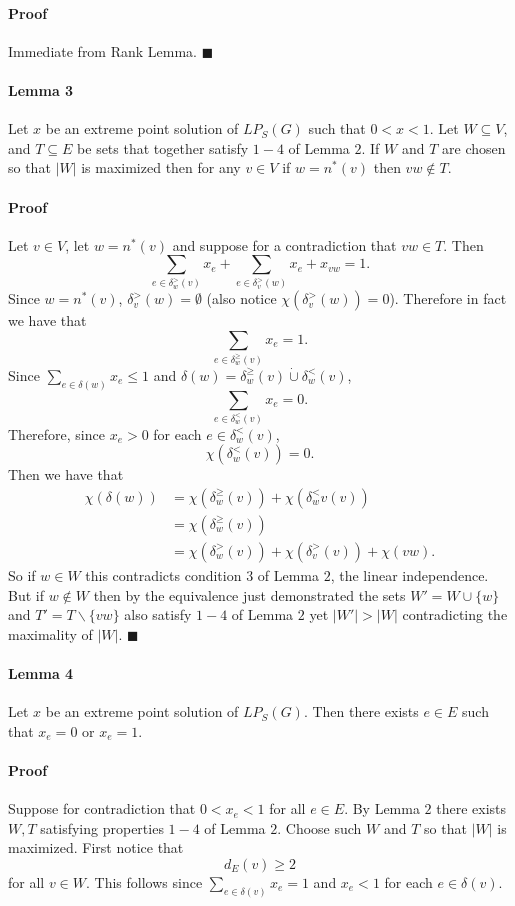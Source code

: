 \documentclass[letterpaper,12pt,oneside,onecolumn]{article}
\begin{document}
\paragraph{Proof}
Immediate from Rank Lemma. $\blacksquare$
\paragraph{Lemma 3}
Let $x$ be an extreme point solution of $LP_S(G)$ such that $0 < x < 1$. Let $W \subseteq V$, and $T \subseteq E$ be sets that together satisfy $1-4$ of Lemma $2$. If $W$ and $T$ are chosen so that $|W|$ is maximized then for any $v \in V$ if $w = n^*(v)$ then $vw \not\in T$.
\paragraph{Proof}
Let $v \in V$, let $w = n^*(v)$ and suppose for a contradiction that $vw \in T$. Then 
$$\sum_{e \in \delta_w^>(v)} x_e + \sum_{e \in \delta_v^>(w)} x_e + x_{vw} = 1. $$
Since $w = n^*(v)$, $\delta_v^>(w) = \emptyset$ (also notice $\chi(\delta_v^>(w)) = 0$). Therefore in fact we have that
$$\sum_{e \in \delta_w^\geq(v)} x_e = 1.$$
Since $\sum_{e \in \delta(w)} x_e \leq 1$ and $\delta(w) = \delta_w^\geq(v) \dot\cup \delta_w^<(v)$, $$\sum_{e \in \delta_w^<(v)} x_e = 0. $$
Therefore, since $x_e > 0$ for each $e \in \delta_w^<(v)$, $$\chi(\delta_w^<(v)) = 0.$$
Then we have that
\begin{align*}
\chi(\delta(w)) &= \chi(\delta_w^\geq(v)) + \chi(\delta_w^<v(v)) \\
&= \chi(\delta_w^\geq(v)) \\
&= \chi(\delta_w^>(v)) + \chi(\delta_v^>(v)) + \chi(vw).
\end{align*}
So if $w \in W$ this contradicts condition $3$ of Lemma $2$, the linear independence. But if $w \not\in W$ then by the equivalence just demonstrated the sets $W' = W \cup \{w\}$ and $T' = T \backslash \{vw\}$ also satisfy $1-4$ of Lemma $2$ yet $|W'| > |W|$ contradicting the maximality of $|W|$. $\blacksquare$
\paragraph{Lemma 4}
Let $x$ be an extreme point solution of $LP_S(G)$. Then there exists $e \in E$ such that $x_e = 0$ or $x_e = 1$.
\paragraph{Proof}
Suppose for contradiction that $0 < x_e < 1$ for all $e \in E$. By Lemma $2$ there exists $W, T$ satisfying properties $1-4$ of Lemma $2$. Choose such $W$ and $T$ so that $|W|$ is maximized. First notice that
$$d_E(v) \geq 2 $$
for all $v \in W$. This follows since $\sum_{e \in \delta(v)} x_e = 1$ and $x_e < 1$ for each $e \in \delta(v)$.
\end{document}
